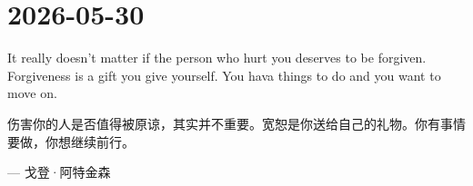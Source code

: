 \section*{2026-05-30}
It really doesn't matter if the person who hurt you deserves to be forgiven. Forgiveness is a gift you give yourself. You hava things to do and you want to move on. \par
伤害你的人是否值得被原谅，其实并不重要。宽恕是你送给自己的礼物。你有事情要做，你想继续前行。 \par
\hfill --- 戈登·阿特金森 \par
